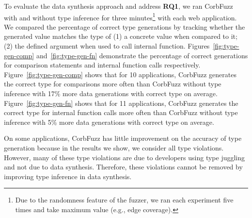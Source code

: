 \documentclass[10pt,conference]{IEEEtran}
\begin{document}
To evaluate the data synthesis approach and address \textbf{RQ1}, we ran CorbFuzz with and without type inference for three minutes\footnote{Due to the randomness feature of the fuzzer, we ran each experiment five times and take maximum value (e.g., edge coverage).} with each web application. We compared the percentage of correct type generations by tracking whether the generated value matches the type of (1) a concrete value when compared to it; (2) the defined argument when used to call internal function. Figures~\ref{fig:type-gen-comp} and~\ref{fig:type-gen-fn} demonstrate the percentage of correct generations for comparison statements and internal function calls respectively. Figure~\ref{fig:type-gen-comp} shows that for 10 applications, CorbFuzz generates the correct type for comparisons more often than CorbFuzz without type inference with 17\% more data generations with correct type on average. Figure~\ref{fig:type-gen-fn} shows that for 11 applications, CorbFuzz generates the correct type for internal function calls more often than CorbFuzz without type inference with 5\% more data generations with correct type on average. %

On some applications, CorbFuzz has little improvement on the accuracy of type generation because in the results we show, we consider all type violations. However, many of these type violations are due to developers using type juggling and not due to data synthesis. Therefore, these violations cannot be removed by improving type inference in data synthesis. 


\end{document}
